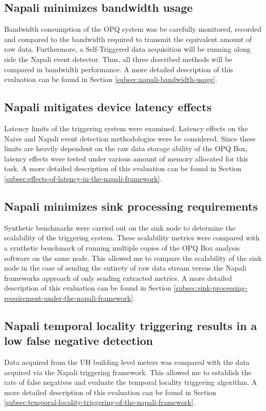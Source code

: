 \subsection{Napali minimizes bandwidth usage}\label{subsec:napali-minimizes-bandwidth-useage}
Bandwidth consumption of the OPQ system was be carefully monitored, recorded and compared to the bandwidth required to transmit the equivalent amount of raw data.
Furthermore, a Self-Triggered data acquisition will be running along side the Napali event detector.
Thus, all three described methods will be compared in bandwidth performance.
A more detailed description of this evaluation can be found in Section \ref{subsec:napali-bandwidth-usage}.

\subsection{Napali mitigates device latency effects}\label{subsec:effects-of-latency-are-minimized:}
Latency limits of the triggering system were examined.
Latency effects on the Naive and Napali event detection methodologies were be considered.
Since these limits are heavily dependent on the raw data storage ability of the OPQ Box, latency effects were tested under various amount of memory allocated for this task.
A more detailed description of this evaluation can be found in Section \ref{subsec:effects-of-latency-in-the-napali-framework}.

\subsection{Napali minimizes sink processing requirements}\label{subsec:napali-minimizes-sink-processing-requirements}
Synthetic benchmarks were carried out on the sink node to determine the scalability of the triggering system.
These scalability metrics were compared with a synthetic benchmark of running multiple copies of the OPQ Box analysis software on the same node.
This allowed me to compare the scalability of the sink node in the case of sending the entirety of raw data stream versus the Napali frameworks approach of only sending extracted metrics.
A more detailed description of this evaluation can be found in Section \ref{subsec:sink-processing-requirement-under-the-napali-framework}.

\subsection{Napali temporal locality triggering results in a low false negative detection}\label{subsec:temporal-locality-capabilities:}
Data acquired from the UH building level meters was compared with the data acquired via the Napali triggering framework.
This allowed me to establish the rate of false negatives and evaluate the temporal locality triggering algorithm.
A more detailed description of this evaluation can be found in Section \ref{subsec:temporal-locality-triggering-of-the-napali-framework}.


